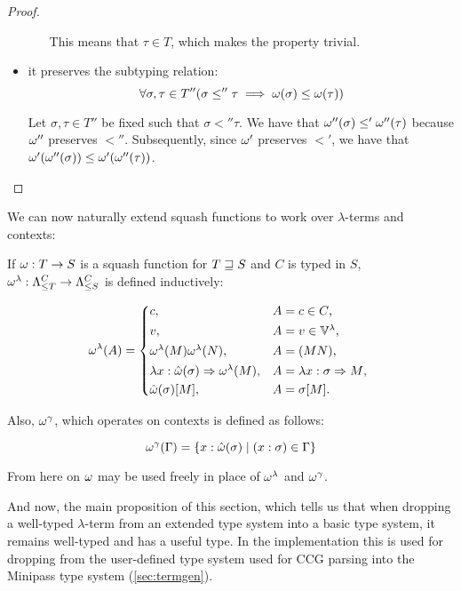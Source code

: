 \documentclass[main.tex]{subfiles}
\begin{document}
\begin{proof}
\begin{itemize}
\begin{itemize}
                    This means that $\tau \in T$, which makes the property trivial.
            \end{itemize}

        \item it preserves the subtyping relation:
            \[ \forall \sigma, \tau \in T'' (\sigma \less'' \tau \implies
                \squash(\sigma) \less \squash(\tau)) \]

            Let $\sigma, \tau \in T''$ be fixed such that $\sigma \less'' \tau$.
            We have that $\squash''(\sigma) \less' \squash''(\tau)$ because
            $\squash''$ preserves $\less''$. Subsequently, since $\squash'$
            preserves $\less'$, we have that $\squash'(\squash''(\sigma))
            \less \squash'(\squash''(\tau))$.
    \end{itemize}
\end{proof}

We can now naturally extend squash functions to work over $\lambda$-terms
and contexts:
\begin{defn}
    If $\squash: T \fun S$ is a squash function for $T \tless S$ and
    $C$ is typed in $S$,
    $\lsquash: \fancylambda{T}{C} \fun \fancylambda{S}{C}$
    is defined inductively:

    \[
        \lsquash(A) =
        \begin{cases*}
            c ,& $A = c \in C$, \\
            v ,& $A = v \in \lvars$, \\
            \lsquash(M) \lsquash(N) ,& $A = (MN)$, \\
            \lambda x : \tsquash(\sigma) \abstr \lsquash(M)
 ,& $A = \lambda x : \sigma \abstr M$, \\
                \tsquash(\sigma)[M] ,& $A = \sigma[M]$. \\
        \end{cases*}
    \]

    Also,
    $\consquash$, which operates on contexts
    is defined as follows:

    \[
        \consquash(\Gamma)
            = \{ x : \tsquash(\sigma) \mid (x : \sigma) \in \Gamma \}
    \]
\end{defn}

From here on $\squash$ may be used freely in place of $\lsquash$
and $\consquash$.

And now, the main proposition of this section, which tells us that when
dropping a well-typed $\lambda$-term from an extended type system into
a basic type system, it remains well-typed and has a useful type.
In the implementation this is used for dropping from the user-defined
type system used for CCG parsing into the Minipass type system
(\cref{sec:termgen}).
\end{document}
